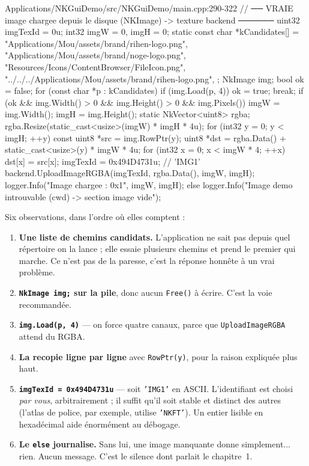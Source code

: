 \begin{nkcode}{Applications/NKGuiDemo/src/NKGuiDemo/main.cpp:290-322}
    // ── VRAIE image chargee depuis le disque (NKImage) -> texture backend ──────
    uint32 imgTexId = 0u;
    int32 imgW = 0, imgH = 0;
    {
        static const char *kCandidates[] = {
            "Applications/Mou/assets/brand/rihen-logo.png",
            "Applications/Mou/assets/brand/noge-logo.png",
            "Resources/Icons/ContentBrowser/FileIcon.png",
            "../../../Applications/Mou/assets/brand/rihen-logo.png",
        };
        NkImage img;
        bool ok = false;
        for (const char *p : kCandidates)
            if (img.Load(p, 4)) {
                ok = true;
                break;
            }
        if (ok && img.Width() > 0 && img.Height() > 0 && img.Pixels()) {
            imgW = img.Width();
            imgH = img.Height();
            static NkVector<uint8> rgba;
            rgba.Resize(static_cast<usize>(imgW) * imgH * 4u);
            for (int32 y = 0; y < imgH; ++y) {
                const uint8 *src = img.RowPtr(y);
                uint8 *dst = rgba.Data() + static_cast<usize>(y) * imgW * 4u;
                for (int32 x = 0; x < imgW * 4; ++x)
                    dst[x] = src[x];
            }
            imgTexId = 0x494D4731u; // 'IMG1'
            backend.UploadImageRGBA(imgTexId, rgba.Data(), imgW, imgH);
            logger.Info("Image chargee : {0}x{1}", imgW, imgH);
        } else {
            logger.Info("Image demo introuvable (cwd) -> section image vide");
        }
    }
\end{nkcode}

Six observations, dans l'ordre où elles comptent :

\begin{enumerate}
  \item \textbf{Une liste de chemins candidats.} L'application ne sait pas
        depuis quel répertoire on la lance ; elle essaie plusieurs chemins et
        prend le premier qui marche. Ce n'est pas de la paresse, c'est la
        réponse honnête à un vrai problème.
  \item \textbf{\texttt{NkImage img;} sur la pile}, donc aucun \texttt{Free()} à
        écrire. C'est la voie recommandée.
  \item \textbf{\texttt{img.Load(p, 4)}} — on force quatre canaux, parce que
        \texttt{UploadImageRGBA} attend du RGBA.
  \item \textbf{La recopie ligne par ligne} avec \texttt{RowPtr(y)}, pour la
        raison expliquée plus haut.
  \item \textbf{\texttt{imgTexId = 0x494D4731u}} — soit \texttt{'IMG1'} en
        ASCII. L'identifiant est choisi \emph{par vous}, arbitrairement ; il
        suffit qu'il soit stable et distinct des autres (l'atlas de police, par
        exemple, utilise \texttt{'NKFT'}). Un entier lisible en hexadécimal aide
        énormément au débogage.
  \item \textbf{Le \texttt{else} journalise.} Sans lui, une image manquante
        donne simplement... rien. Aucun message. C'est le silence dont parlait
        le chapitre~1.
\end{enumerate}

